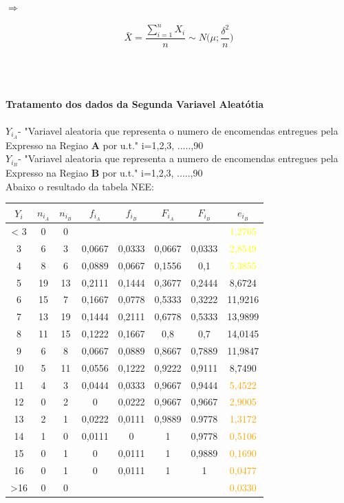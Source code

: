 \hspace{3cm} $\Longrightarrow$ \hspace{3cm}
\begin{minipage}[l]{0pt}
\[\bar{X}=\frac{\sum_{i=1}^nX_i}{n}\sim N \big(\mu;\frac{\delta^2}{n}\big)\]
\end{minipage}\\
\\
\\
\noindent
\textbf{Tratamento dos dados da Segunda Variavel Aleatótia} \\
\\
$Y_{i_A}$- "Variavel aleatoria que representa o numero de encomendas entregues pela Expresso na Regiao \textbf{A} por u.t." \quad i=1,2,3, .....,90 \\
$Y_{i_B}$- "Variavel aleatoria que representa a numero de encomendas entregues pela Expresso na Regiao \textbf{B} por u.t." \quad i=1,2,3, .....,90 \\
Abaixo o resultado da tabela NEE:\\
\begin{minipage}{0pt}
\begin{tabular}{ |c|c|c|c|c|c|c|c| }
\hline
\rowcolor[gray]{0.7}
$Y_i$ & $n_{i_A}$ & $n_{i_B}$ & $f_{i_A}$ & $f_{i_B}$ & $F_{i_A}$ & $F_{i_B}$ & $e_{i_B}$ \\
\hline
< 3 & 0 & 0 & & & & & \textcolor{yellow}{1,2765} \\
\hline
3 & 6 & 3 & 0,0667 & 0,0333 & 0,0667 & 0,0333 & \textcolor{yellow}{2,8549} \\
\hline
4 & 8 & 6 & 0,0889 & 0,0667 & 0,1556 & 0,1 & \textcolor{yellow}{5,3855} \\
\hline
5 & 19 & 13 & 0,2111 & 0,1444 & 0,3677 & 0,2444 & 8,6724 \\
\hline
6 & 15 & 7 & 0,1667 & 0,0778 & 0,5333 & 0,3222 & 11,9216 \\
\hline
7 & 13 & 19 & 0,1444 & 0,2111 & 0,6778 & 0,5333 & 13,9899 \\
\hline
8 & 11 & 15 & 0,1222 & 0,1667 & 0,8 & 0,7 & 14,0145 \\
\hline
9 & 6 & 8 & 0,0667 & 0,0889 & 0,8667 & 0,7889 & 11,9847 \\
\hline
10 & 5 & 11 & 0,0556 & 0,1222 & 0,9222 & 0,9111 & 8,7490 \\
\hline
11 & 4 & 3 & 0,0444 & 0,0333 & 0,9667 & 0,9444 & \textcolor{orange}{5,4522}\\
\hline
12 & 0 & 2 & 0 & 0,0222 & 0,9667 & 0,9667 & \textcolor{orange}{2,9005} \\
\hline
13 & 2 & 1 & 0,0222 & 0,0111 & 0,9889 & 0.9778 & \textcolor{orange}{1,3172} \\
\hline
14 & 1 & 0 & 0,0111 & 0 & 1 & 0,9778 & \textcolor{orange}{0,5106} \\
\hline
15 & 0 & 1 & 0 & 0,0111 & 1 & 0,9889 & \textcolor{orange}{0,1690} \\
\hline
16 & 0 & 1 & 0 & 0,0111 & 1 & 1 & \textcolor{orange}{0,0477} \\
\hline
>16 & 0 & 0 & & & & & \textcolor{orange}{0,0330} \\
\hline
\end{tabular}
\end{minipage}
